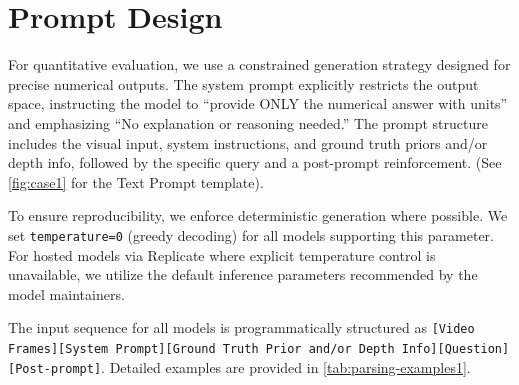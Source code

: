 \section{Prompt Design} \label{appendix:prompt_design}
For quantitative evaluation, we use a constrained generation strategy designed for precise numerical outputs. The system prompt explicitly restricts the output space, instructing the model to ``provide ONLY the numerical answer with units'' and emphasizing ``No explanation or reasoning needed.'' The prompt structure includes the visual input, system instructions, and ground truth priors and/or depth info, followed by the specific query and a post-prompt reinforcement. (See \autoref{fig:case1} for the Text Prompt template).

To ensure reproducibility, we enforce deterministic generation where possible. We set \texttt{temperature=0} (greedy decoding) for all models supporting this parameter. For hosted models via Replicate where explicit temperature control is unavailable, we utilize the default inference parameters recommended by the model maintainers.

The input sequence for all models is programmatically structured as \texttt{[Video Frames][System Prompt][Ground Truth Prior and/or Depth Info][Question][Post-prompt]}. Detailed examples are provided in \autoref{tab:parsing-examples1}.

